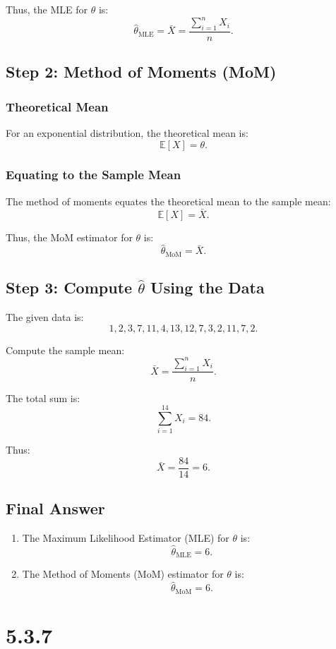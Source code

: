 \documentclass{article}
\begin{document}
Thus, the MLE for $\theta$ is:
\[
\hat{\theta}_{\text{MLE}} = \bar{X} = \frac{\sum_{i=1}^n X_i}{n}.
\]

\subsection*{Step 2: Method of Moments (MoM)}

\subsubsection*{Theoretical Mean}
For an exponential distribution, the theoretical mean is:
\[
\mathbb{E}[X] = \theta.
\]

\subsubsection*{Equating to the Sample Mean}
The method of moments equates the theoretical mean to the sample mean:
\[
\mathbb{E}[X] = \bar{X}.
\]

Thus, the MoM estimator for $\theta$ is:
\[
\hat{\theta}_{\text{MoM}} = \bar{X}.
\]

\subsection*{Step 3: Compute $\hat{\theta}$ Using the Data}
The given data is:
\[
1, 2, 3, 7, 11, 4, 13, 12, 7, 3, 2, 11, 7, 2.
\]

Compute the sample mean:
\[
\bar{X} = \frac{\sum_{i=1}^n X_i}{n}.
\]

The total sum is:
\[
\sum_{i=1}^{14} X_i = 84.
\]

Thus:
\[
\bar{X} = \frac{84}{14} = 6.
\]

\subsection*{Final Answer}
\begin{enumerate}
    \item The Maximum Likelihood Estimator (MLE) for $\theta$ is:
    \[
    \hat{\theta}_{\text{MLE}} = 6.
    \]
    \item The Method of Moments (MoM) estimator for $\theta$ is:
    \[
    \hat{\theta}_{\text{MoM}} = 6.
    \]
\end{enumerate}


\section*{5.3.7}
\end{document}
